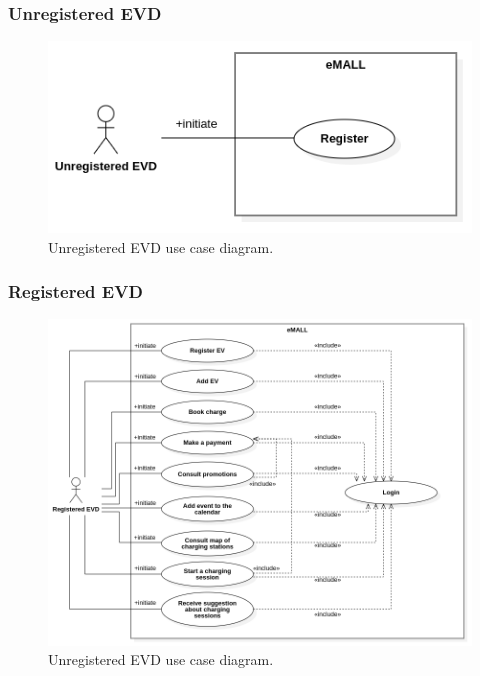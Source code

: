 \subsubsection*{Unregistered EVD}
\begin{figure} [H]
    \begin{center}
        \includegraphics[width=0.7\linewidth]{Images/UseCaseDiagrams/unregistered_EVD_use_case_diagram}
        \caption{Unregistered EVD use case diagram.}
        \label{fig: unregistered_EVD_diag}
    \end{center}
\end{figure}

\subsubsection*{Registered EVD}
\begin{figure} [H]
    \begin{center}
        \includegraphics[width=0.9\linewidth]{Images/UseCaseDiagrams/registered_EVD_use_case_diagram}
        \caption{Unregistered EVD use case diagram.}
        \label{fig: reg_EVD_diag}
    \end{center}
\end{figure}

